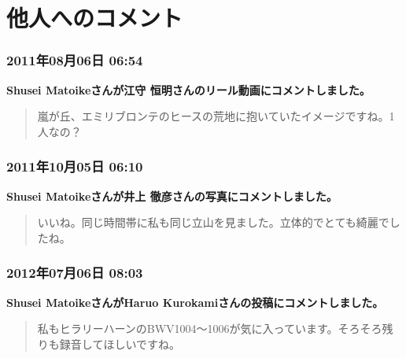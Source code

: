 \documentclass[facebook_diary.tex]{subfiles}
\begin{document}
\chapter{他人へのコメント}

\subsection*{2011年08月06日 06:54}

\textbf{Shusei Matoikeさんが江守 恒明さんのリール動画にコメントしました。}

\begin{quote}
嵐が丘、エミリブロンテのヒースの荒地に抱いていたイメージですね。1人なの？

\end{quote}

\subsection*{2011年10月05日 06:10}

\textbf{Shusei Matoikeさんが井上 徹彦さんの写真にコメントしました。}

\begin{quote}
いいね。同じ時間帯に私も同じ立山を見ました。立体的でとても綺麗でしたね。

\end{quote}

\subsection*{2012年07月06日 08:03}

\textbf{Shusei MatoikeさんがHaruo Kurokamiさんの投稿にコメントしました。}

\begin{quote}
私もヒラリーハーンのBWV1004〜1006が気に入っています。そろそろ残りも録音してほしいですね。

\end{quote}
\end{document}
